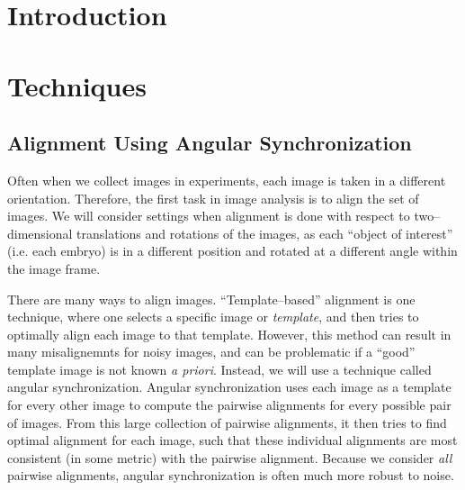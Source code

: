 \documentclass[12pt]{article}
\begin{document}
\section{Introduction}


\section{Techniques}


\subsection{Alignment Using Angular Synchronization}

Often when we collect images in experiments, each image is taken in a different orientation. 
%
Therefore, the first task in image analysis is to align the set of images. 
%
We will consider settings when alignment is done with respect to two--dimensional translations and rotations of the images, as each ``object of interest'' (i.e. each embryo) is in a different position and rotated at a different angle within the image frame. 


There are many ways to align images. 
%
``Template--based'' alignment \cite{...} is one technique, where one selects a specific image or {\em template}, and then tries to optimally align each image to that template.
%
However, this method can result in many misalignemnts for noisy images, and can be problematic if a ``good'' template image is not known {\em a priori}. 
%
Instead, we will use a technique called angular synchronization\cite{singer2011angular}.
%
Angular synchronization uses each image as a template for every other image to compute the pairwise alignments for every possible pair of images.
%
From this large collection of pairwise alignments, it then tries to find optimal alignment for each image, such that these individual alignments are most consistent (in some metric) with the pairwise alignment.
%
Because we consider {\em all} pairwise alignments, angular synchronization is often much more robust to noise. 
\end{document}
